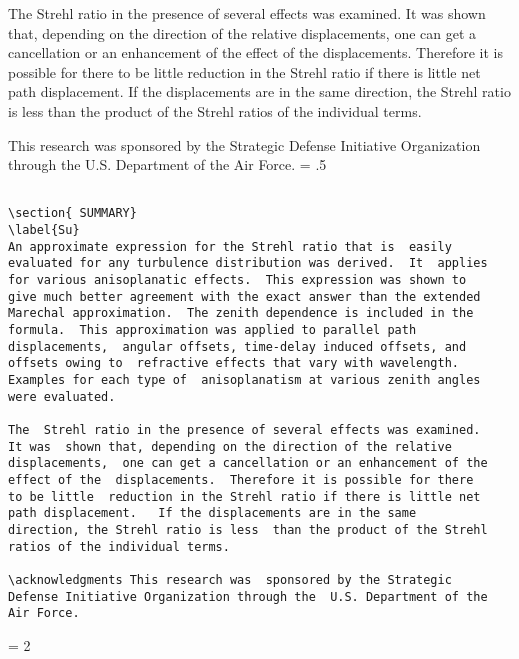 The  Strehl ratio in the presence of several effects was examined.
It was  shown that, depending on the direction of the relative
displacements,  one can get a cancellation or an enhancement of the
effect of the  displacements.  Therefore it is possible for there
to be little  reduction in the Strehl ratio if there is little net
path displacement.   If the displacements are in the same
direction, the Strehl ratio is less  than the product of the Strehl
ratios of the individual terms.

\acknowledgments This research was  sponsored by the Strategic
Defense Initiative Organization through the  U.S. Department of the
Air Force.
\newpage
\baselineskip = .5\baselineskip  %
\begin{verbatim}

\section{ SUMMARY}
\label{Su}
An approximate expression for the Strehl ratio that is  easily
evaluated for any turbulence distribution was derived.  It  applies
for various anisoplanatic effects.  This expression was shown to
give much better agreement with the exact answer than the extended
Marechal approximation.  The zenith dependence is included in the
formula.  This approximation was applied to parallel path
displacements,  angular offsets, time-delay induced offsets, and
offsets owing to  refractive effects that vary with wavelength.
Examples for each type of  anisoplanatism at various zenith angles
were evaluated.

The  Strehl ratio in the presence of several effects was examined.
It was  shown that, depending on the direction of the relative
displacements,  one can get a cancellation or an enhancement of the
effect of the  displacements.  Therefore it is possible for there
to be little  reduction in the Strehl ratio if there is little net
path displacement.   If the displacements are in the same
direction, the Strehl ratio is less  than the product of the Strehl
ratios of the individual terms.

\acknowledgments This research was  sponsored by the Strategic
Defense Initiative Organization through the  U.S. Department of the
Air Force.

\end{verbatim}
\newpage
\baselineskip = 2\baselineskip  %


